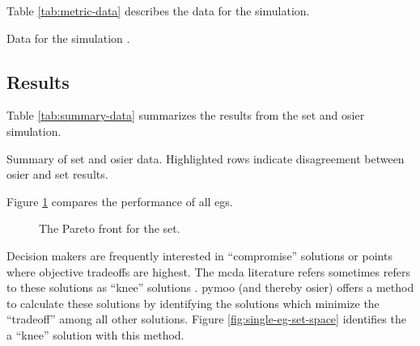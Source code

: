 Table \ref{tab:metric-data} describes the data for the simulation.

\begin{sidewaystable}[htbp!]
    \centering
    \caption{Data for the simulation \cite{wigeland_nuclear_2014-1}.}
    \label{tab:metric-data}
    \resizebox*{\textwidth}{!}{}
\end{sidewaystable}

\subsection{Results}

Table \ref{tab:summary-data} summarizes the results from the \ac{set} and \ac{osier} simulation.

\begin{table}[htbp!]
    \centering
    \caption{Summary of \ac{set} and \ac{osier} data. 
    Highlighted rows indicate disagreement between \ac{osier} and \ac{set} results.}
    \label{tab:summary-data}
    \resizebox*{0.75\textwidth}{!}{}
\end{table}


Figure \ref{fig:full-set-space} compares the performance of all \acp{eg}.

\begin{figure}[htbp!]
  \centering
  \resizebox{0.8\columnwidth}{!}{}
  \caption{The Pareto front for the \ac{set}.}
  \label{fig:full-set-space}
\end{figure}



Decision makers are frequently interested in ``compromise'' solutions or points where objective 
tradeoffs are highest. The \ac{mcda} literature refers sometimes refers to these solutions as ``knee''
solutions \cite{rachmawati_multiobjective_2009}. \ac{pymoo} (and thereby \ac{osier}) offers a method
to calculate these solutions by identifying the solutions which minimize the ``tradeoff'' among all
other solutions. Figure \ref{fig:single-eg-set-space} identifies the a ``knee'' solution with this method.

